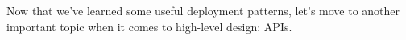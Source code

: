 Now that we've learned some useful deployment patterns, let's move to another important topic when it comes to high-level design: APIs.



























